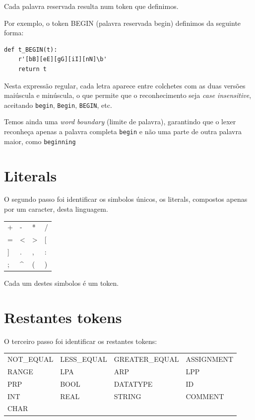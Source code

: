 \documentclass[12pt,a4paper]{report}
\begin{document}
Cada palavra reservada resulta num token que definimos.

\vspace{1em}

Por exemplo, o token BEGIN (palavra reservada begin) definimos da seguinte forma:

\begin{verbatim}
def t_BEGIN(t):
    r'[bB][eE][gG][iI][nN]\b'
    return t
\end{verbatim}

Nesta expressão regular, cada letra aparece entre colchetes com as duas versões maiúscula e minúscula, o que permite que o reconhecimento seja \emph{case insensitive}, aceitando \texttt{begin}, \texttt{Begin}, \texttt{BEGIN}, etc.

Temos ainda uma \emph{word boundary} (limite de palavra), garantindo que o lexer reconheça apenas a palavra completa \texttt{begin} e não uma parte de outra palavra maior, como \texttt{beginning}

\section{Literals}

O segundo passo foi identificar os simbolos únicos, os literals, compostos apenas por um caracter, desta linguagem.

\begin{center}
\begin{tabular}{>{\ttfamily} l >{\ttfamily} l >{\ttfamily} l >{\ttfamily} l}
\toprule
+ & - & * & / \\
= & < & > & [ \\
] & . & , & : \\
; & \^{} & ( & ) \\
\bottomrule
\end{tabular}
\end{center}

Cada um destes simbolos é um token.

\section{Restantes tokens}

O terceiro passo foi identificar os restantes tokens:
\begin{center}
\begin{tabular}{>{\ttfamily} l >{\ttfamily} l >{\ttfamily} l >{\ttfamily} l}
\toprule
NOT\_EQUAL & LESS\_EQUAL & GREATER\_EQUAL & ASSIGNMENT \\
RANGE & LPA & ARP & LPP \\
PRP & BOOL & DATATYPE & ID \\
INT & REAL & STRING & COMMENT \\
CHAR \\
\bottomrule
\end{tabular}
\end{center}
\end{document}
